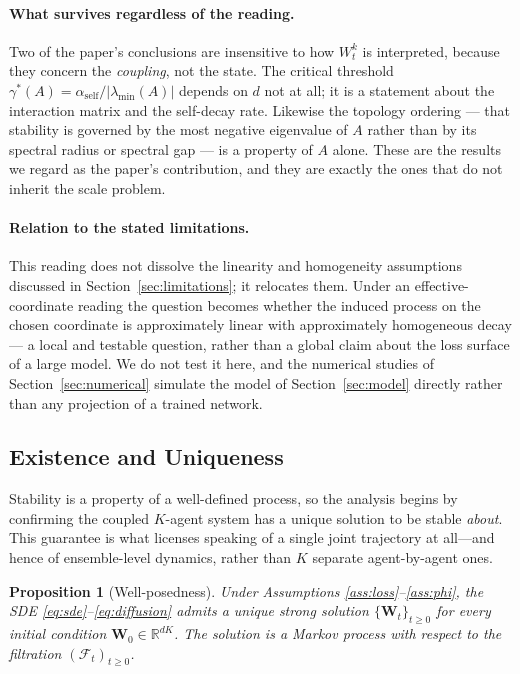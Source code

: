 \documentclass[12pt]{article}
\theoremstyle{plain}
\newtheorem{proposition}[theorem]{Proposition}
\theoremstyle{definition}
\newcommand{\R}{\mathbb{R}}
\newcommand{\W}{\mathbf{W}}
\newcommand{\abs}[1]{\left| #1 \right|}
\begin{document}
\paragraph{What survives regardless of the reading.}
Two of the paper's conclusions are insensitive to how $W^k_t$ is interpreted, because they concern
the \emph{coupling}, not the state. The critical threshold
$\gamma^*(A)=\alpha_{\mathrm{self}}/\abs{\lambda_{\min}(A)}$ depends on $d$ not at all; it is a
statement about the interaction matrix and the self-decay rate. Likewise the topology ordering ---
that stability is governed by the most negative eigenvalue of $A$ rather than by its spectral radius
or spectral gap --- is a property of $A$ alone. These are the results we regard as the paper's
contribution, and they are exactly the ones that do not inherit the scale problem.

\paragraph{Relation to the stated limitations.}
This reading does not dissolve the linearity and homogeneity assumptions discussed in
Section~\ref{sec:limitations}; it relocates them. Under an effective-coordinate reading the
question becomes whether the induced process on the chosen coordinate is approximately linear with
approximately homogeneous decay --- a local and testable question, rather than a global claim about
the loss surface of a large model. We do not test it here, and the numerical studies of
Section~\ref{sec:numerical} simulate the model of Section~\ref{sec:model} directly rather than any
projection of a trained network.

\subsection{Existence and Uniqueness}

Stability is a property of a well-defined process, so the analysis begins by confirming the coupled $K$-agent system has a unique solution to be stable \emph{about}. This guarantee is what licenses speaking of a single joint trajectory at all---and hence of ensemble-level dynamics, rather than $K$ separate agent-by-agent ones.

\begin{proposition}[Well-posedness]
  \label{prop:wellposed}
  Under Assumptions \ref{ass:loss}--\ref{ass:phi}, the SDE
  \eqref{eq:sde}--\eqref{eq:diffusion} admits a unique strong solution
  $\{\W_t\}_{t \geq 0}$ for every initial condition
  $\W_0 \in \R^{dK}$.  The solution is a Markov process with respect
  to the filtration $(\mathcal{F}_t)_{t \geq 0}$.
\end{proposition}
\end{document}
